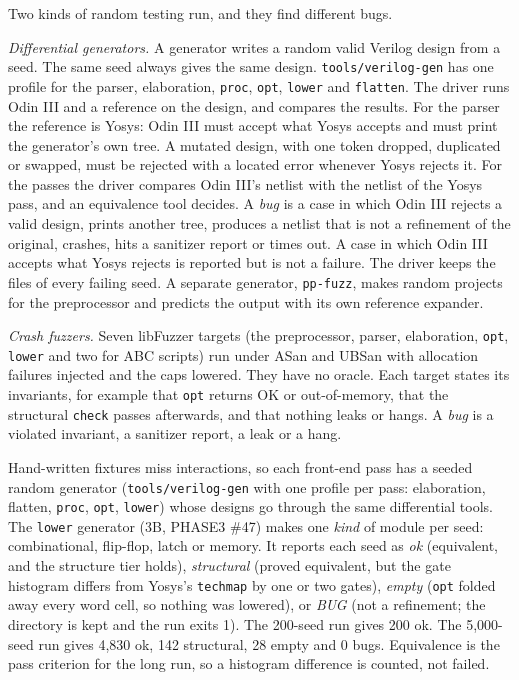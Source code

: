 \documentclass[conference]{IEEEtran}
\newcommand{\code}[1]{\texttt{#1}}
\begin{document}
Two kinds of random testing run, and they find different bugs.

\emph{Differential generators.} A generator writes a random valid Verilog design from a seed. The
same seed always gives the same design. \code{tools/verilog-gen} has one profile for the parser,
elaboration, \code{proc}, \code{opt}, \code{lower} and \code{flatten}. The driver runs Odin III
and a reference on the design, and compares the results. For the parser the reference is Yosys:
Odin III must accept what Yosys accepts and must print the generator's own tree. A mutated design,
with one token dropped, duplicated or swapped, must be rejected with a located error whenever
Yosys rejects it. For the passes the driver compares Odin III's netlist with the netlist of the
Yosys pass, and an equivalence tool decides. A \emph{bug} is a case in which Odin III rejects
a valid design, prints another tree, produces a netlist that is not a refinement of the original,
crashes, hits a sanitizer report or times out. A case in which Odin III accepts what Yosys rejects
is reported but is not a failure. The driver keeps the files of every failing seed. A separate
generator, \code{pp-fuzz}, makes random projects for the preprocessor and predicts the output with
its own reference expander.

\emph{Crash fuzzers.} Seven libFuzzer targets (the preprocessor, parser, elaboration, \code{opt},
\code{lower} and two for ABC scripts) run under ASan and UBSan with allocation failures injected
and the caps lowered. They have no oracle. Each target states its invariants, for example that
\code{opt} returns OK or out-of-memory, that the structural \code{check} passes afterwards, and
that nothing leaks or hangs. A \emph{bug} is a violated invariant, a sanitizer report, a leak or a
hang.

Hand-written fixtures miss interactions, so each front-end pass has a seeded random generator
(\code{tools/verilog-gen} with one profile per pass: elaboration, flatten, \code{proc},
\code{opt}, \code{lower}) whose designs go through the same differential tools. The \code{lower}
generator (3B, PHASE3 \#47) makes one \emph{kind} of module per seed: combinational,
flip-flop, latch or memory. It reports each seed as \emph{ok} (equivalent, and the structure
tier holds), \emph{structural} (proved equivalent, but the gate histogram differs from Yosys's
\code{techmap} by one or two gates), \emph{empty} (\code{opt} folded away every word cell, so
nothing was lowered), or \emph{BUG} (not a refinement; the directory is kept and the run exits
1). The 200-seed run gives 200 ok. The 5,000-seed run gives 4,830 ok, 142 structural, 28 empty
and 0 bugs. Equivalence is the pass criterion for the long run, so a histogram difference is
counted, not failed.
\end{document}
